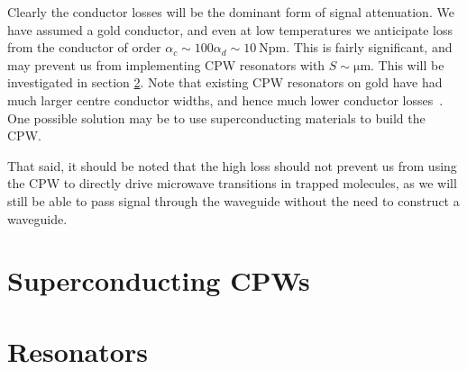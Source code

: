 \documentclass[a4paper]{article}
\begin{document}
Clearly the conductor losses will be the dominant form of signal attenuation. We
have assumed a gold conductor, and even at low temperatures we anticipate loss
from the conductor of order $\alpha_c \sim 100 \alpha_d \sim
\SI{10}{\neper\meter}$. This is fairly significant, and may prevent us from
implementing CPW resonators with $S\sim\si{\micro\meter}$. This will be
investigated in section \ref{sec:resonators}. Note that existing
CPW resonators on gold have had much larger centre conductor widths, and hence
much lower conductor losses~\cite{1127105}. One possible solution may be to use
superconducting materials to build the CPW.

That said, it should be noted that the high loss should not prevent us from
using the CPW to directly drive microwave transitions in trapped molecules, as
we will still be able to pass signal through the waveguide without the need to
construct a waveguide.

\section{Superconducting CPWs}

\section{Resonators}
\label{sec:resonators}




\end{document}
